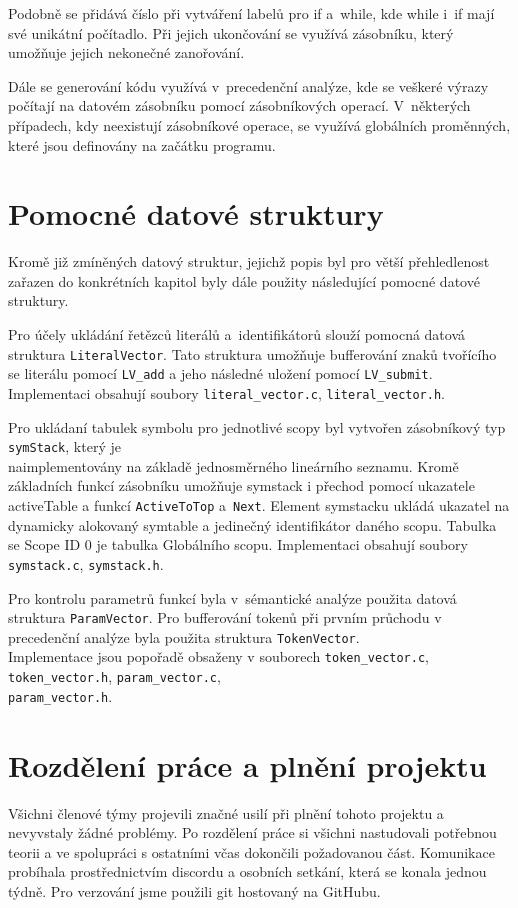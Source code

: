 \documentclass[11spt]{article}
\begin{document}
Podobně se přidává číslo při vytváření labelů pro if a~while, kde while i~if mají své unikátní počítadlo.
Při jejich ukončování se využívá zásobníku, který umožňuje jejich nekonečné zanořování.


Dále se generování kódu využívá v~precedenční analýze, kde se veškeré výrazy počítají na datovém zásobníku pomocí zásobníkových operací.
V~některých případech, kdy neexistují zásobníkové operace, se využívá globálních proměnných, které jsou definovány na začátku programu.
\section{Pomocné datové struktury}

Kromě již zmíněných datový struktur, jejichž popis byl pro větší přehledlenost zařazen do
konkrétních kapitol byly dále použity následující pomocné datové struktury.

Pro účely ukládání řetězců literálů a~identifikátorů slouží pomocná datová struktura \texttt{LiteralVector}.
Tato struktura umožňuje bufferování znaků tvořícího se literálu pomocí
\texttt{LV\_add} a jeho následné uložení pomocí \texttt{LV\_submit}.
Implementaci obsahují soubory \texttt{literal\_vector.c}, \texttt{literal\_vector.h}.

Pro ukládaní tabulek symbolu pro jednotlivé scopy byl vytvořen zásobníkový typ \texttt{symStack},
který je \\ naimplementovány na základě jednosměrného lineárního seznamu. Kromě základních funkcí
zásobníku umožňuje symstack i přechod pomocí ukazatele activeTable a funkcí \texttt{ActiveToTop} a~\texttt{Next}.
Element symstacku ukládá ukazatel na dynamicky alokovaný symtable a jedinečný identifikátor daného scopu.
Tabulka se Scope ID 0 je tabulka Globálního scopu.
Implementaci obsahují soubory \texttt{symstack.c}, \texttt{symstack.h}.

Pro kontrolu parametrů funkcí byla v~sémantické analýze použita datová struktura \texttt{ParamVector}.
Pro bufferování tokenů při prvním průchodu v precedenční analýze byla použita struktura \texttt{TokenVector}.\\
Implementace jsou popořadě obsaženy v souborech
\texttt{token\_vector.c}, \texttt{token\_vector.h}, \texttt{param\_vector.c}, \\ \texttt{param\_vector.h}.




\section{Rozdělení práce a plnění projektu}
Všichni členové týmy projevili značné usilí při plnění tohoto projektu a
nevyvstaly žádné problémy. Po rozdělení práce si všichni nastudovali potřebnou teorii
a ve spolupráci s ostatními včas dokončili požadovanou část. Komunikace probíhala 
prostřednictvím discordu a osobních setkání, která se konala jednou týdně. Pro verzování
jsme použili git hostovaný na GitHubu. 
\end{document}
